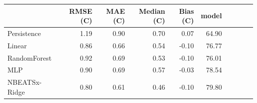 \begin{tabular}{lrrrrr}
\toprule
 & RMSE (C) & MAE (C) & Median (C) & Bias (C) & %
model &  &  &  &  &  \\
\midrule
Persistence & 1.19 & 0.90 & 0.70 & 0.07 & 64.90 \\
Linear & 0.86 & 0.66 & 0.54 & -0.10 & 76.77 \\
RandomForest & 0.92 & 0.69 & 0.53 & -0.10 & 76.01 \\
MLP & 0.90 & 0.69 & 0.57 & -0.03 & 78.54 \\
NBEATSx-Ridge & 0.80 & 0.61 & 0.46 & -0.10 & 79.80 \\
\bottomrule
\end{tabular}
